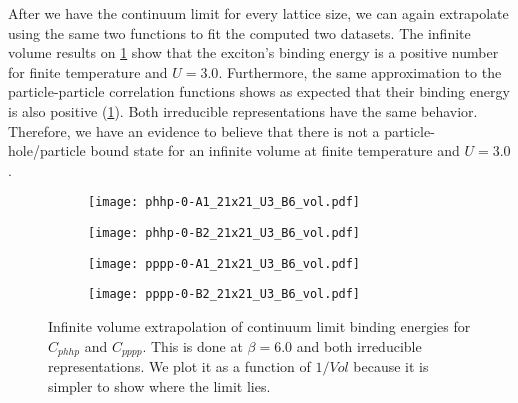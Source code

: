After we have the continuum limit for every lattice size, we can again extrapolate using the same two functions to fit the computed two datasets. The infinite volume results on \cref{fig:u3vol} show that the exciton's binding energy is a positive number for finite temperature and $U=3.0$. Furthermore, the same approximation to the particle-particle correlation functions shows as expected that their binding energy is also positive (\cref{fig:u3vol}). Both irreducible representations have the same behavior. Therefore, we have an evidence to believe that there is not a particle-hole/particle bound state for an infinite volume at finite temperature and $U=3.0$.
\begin{figure}[!htbp]
  \begin{subfigure}{.5\textwidth}
    \centering
    \texttt{[image: phhp-0-A1\_21x21\_U3\_B6\_vol.pdf]}
  \end{subfigure}%
  \begin{subfigure}{.5\textwidth}
    \centering
    \texttt{[image: phhp-0-B2\_21x21\_U3\_B6\_vol.pdf]}
  \end{subfigure}
  \begin{subfigure}{.5\textwidth}
      \centering
      \texttt{[image: pppp-0-A1\_21x21\_U3\_B6\_vol.pdf]}
  \end{subfigure}
  \begin{subfigure}{.5\textwidth}
      \centering
      \texttt{[image: pppp-0-B2\_21x21\_U3\_B6\_vol.pdf]}
  \end{subfigure}
  \caption{Infinite volume extrapolation of continuum limit binding energies for $C_{phhp}$ and $C_{pppp}$. This is done at $\beta=6.0$ and both irreducible representations. We plot it as a function of $1/Vol$ because it is simpler to show where the limit lies.}
  \label{fig:u3vol}
\end{figure}


